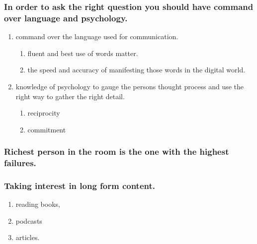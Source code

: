 \documentclass[11pt]{article}
\begin{document}
\subsubsection{In order to ask the right question you should have command over language and psychology.}
\label{sec:org678cfc6}
\begin{enumerate}
\item command over the language used for communication.
\label{sec:org5f6d221}
\begin{enumerate}
\item fluent and best use of words matter.
\label{sec:orgea4f1d2}
\item the speed and accuracy of manifesting those words in the digital world.
\label{sec:orga03babe}
\end{enumerate}
\item knowledge of psychology to gauge the persons thought process and use the right way to gather the right detail.
\label{sec:orgfbb3563}
\begin{enumerate}
\item reciprocity
\label{sec:org341bda4}
\item commitment
\label{sec:org64417e7}
\end{enumerate}
\end{enumerate}
\subsubsection{Richest person in the room is the one with the highest failures.}
\label{sec:org5c13227}
\subsubsection{Taking interest in long form content.}
\label{sec:orge5ca2d3}
\begin{enumerate}
\item reading books,
\label{sec:orgb365fbd}
\item podcasts
\label{sec:orgfed3f4e}
\item articles.
\label{sec:org16909dc}
\end{enumerate}
\end{document}

